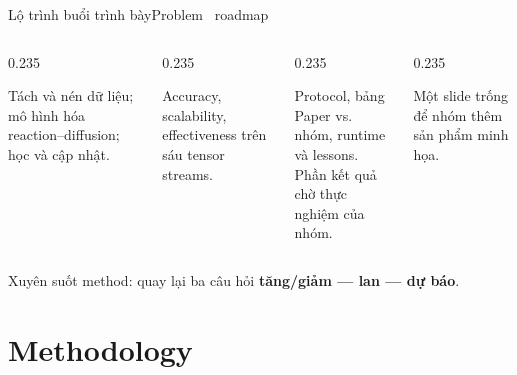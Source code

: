 \documentclass[aspectratio=169,11pt]{beamer}
\begin{document}
\begin{frame}[shrink=5]{Lộ trình buổi trình bày}{Problem \textperiodcentered\ roadmap}
\begin{columns}[T,onlytextwidth]
\begin{column}{0.235\textwidth}
\begin{intuition}
  Tách và nén dữ liệu; mô hình hóa reaction--diffusion; học và cập nhật.
\end{intuition}
\end{column}
\begin{column}{0.235\textwidth}
\begin{mathcard}
  Accuracy, scalability, effectiveness trên sáu tensor streams.
\end{mathcard}
\end{column}
\begin{column}{0.235\textwidth}
\begin{questioncard}
  \par
  Protocol, bảng Paper vs. nhóm, runtime và lessons.\\[2mm]
  {\small Phần kết quả chờ thực nghiệm của nhóm.}
\end{questioncard}
\end{column}
\begin{column}{0.235\textwidth}
\begin{takeaway}
  Một slide trống để nhóm thêm sản phẩm minh họa.
\end{takeaway}
\end{column}
\end{columns}
\vspace{7mm}
\centering
{\large\color{DTNavy}Xuyên suốt method: quay lại ba câu hỏi \textbf{tăng/giảm --- lan --- dự báo}.}
\end{frame}

\section{Methodology}
\end{document}
